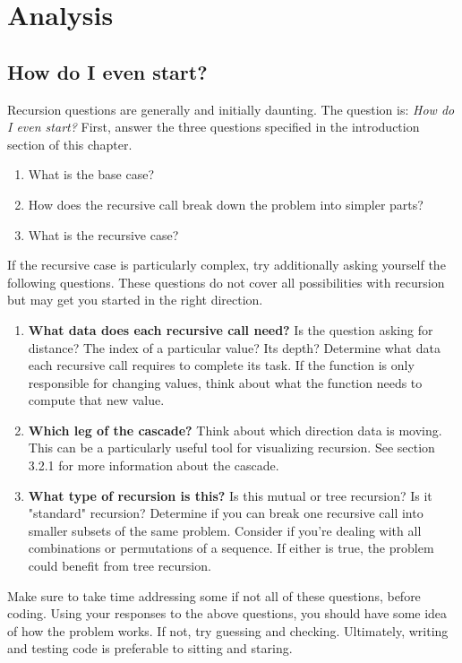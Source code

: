 \documentclass[a4paper]{book}
\begin{document}
\section{Analysis}

\subsection{How do I even start?}

Recursion questions are generally and initially daunting. The question is: \textit{How do I even start?} First, answer the three questions specified in the introduction section of this chapter.

\begin{enumerate}
\item What is the base case?
\item How does the recursive call break down the problem into simpler parts?
\item What is the recursive case?
\end{enumerate}

If the recursive case is particularly complex, try additionally asking yourself the following questions. These questions do not cover all possibilities with recursion but may get you started in the right direction.

\begin{enumerate}
\item \textbf{What data does each recursive call need?}  Is the question asking for distance? The index of a particular value? Its depth? Determine what data each recursive call requires to complete its task. If the function is only responsible for changing values, think about what the function needs to compute that new value. 
\item \textbf{Which leg of the cascade?} Think about which direction data is moving. This can be a particularly useful tool for visualizing recursion. See section 3.2.1 for more information about the cascade.
\item \textbf{What type of recursion is this?} Is this mutual or tree recursion? Is it "standard" recursion? Determine if you can break one recursive call into smaller subsets of the same problem. Consider if you're dealing with all combinations or permutations of a sequence. If either is true, the problem could benefit from tree recursion. 
\end{enumerate}

Make sure to take time addressing some if not all of these questions, before coding. Using your responses to the above questions, you should have some idea of how the problem works. If not, try guessing and checking. Ultimately, writing and testing code is preferable to sitting and staring.
\end{document}
